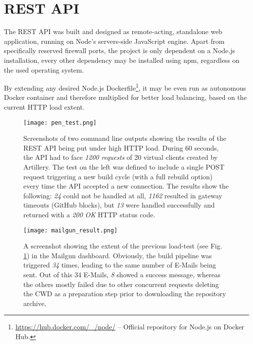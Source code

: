 \section{REST API}
\label{sec:restapi}
The REST API was built and designed as remote-acting, standalone web application, running on Node's servers-side JavaScript engine. Apart from specifically reserved firewall ports, the project is only dependent on a Node.js installation, every other dependency may be installed using npm, regardless on the used operating system.

By extending any desired Node.js Dockerfile\footnote{\url{https://hub.docker.com/\_/node/} -- Official repository for Node.js on Docker Hub.}, it may be even run as autonomous Docker container and therefore multiplied for better load balancing, based on the current HTTP load extent.


\begin{figure} %
    \centering
    \texttt{[image: pen\_test.png]}
    \caption{Screenshots of two command line outputs showing the results of the REST API being put under high HTTP load. During 60 seconds, the API had to face \emph{1200 requests} of 20 virtual clients created by Artillery. The test on the left was defined to include a single POST request triggering a new build cycle (with a full rebuild option) every time the API accepted a new connection. The results show the following: \emph{24} could not be handled at all, \emph{1162} resulted in gateway timeouts (GitHub blocks), but \emph{13} were handled successfully and returned with a \emph{200 OK} HTTP status code.}
    \label{fig:pen-test}
\end{figure}
%

\begin{figure} %
    \centering
    \texttt{[image: mailgun\_result.png]}
    \caption{A screenshot showing the extent of the previous load-test (see Fig. \ref{fig:pen-test}) in the Mailgun dashboard. Obviously, the build pipeline was triggered \emph{34} times, leading to the same number of E-Mails being sent. Out of this 34 E-Mails, \emph{8} showed a success message, whereas the others mostly failed due to other concurrent requests deleting the CWD as a preparation step prior to downloading the repository archive.}
    \label{fig:mailgun-result}
\end{figure}
%

